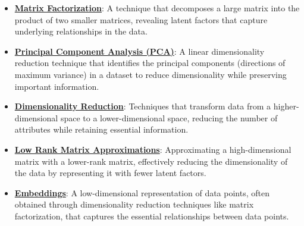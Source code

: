\documentclass{article}%
\begin{document}
\begin{itemize}[leftmargin=*]%
\item \href{https://purdue.brightspace.com/d2l/common/assets/pdfjs-d2l-dist/1.0.14-legacy/web/viewer.html?file=\%2Fcontent\%2Fenforced\%2F1095467-wl.202510.CS.24300.001\%2F11L2-svd-pca-recommender.pdf\%3Fou\%3D1095467\&lang=en-us\&container=d2l-fileviewer-rendered-pdf\&fullscreen=d2l-fileviewer-rendered-pdf-dialog\&height=667#page=2}{\textbf{Matrix Factorization}}: A technique that decomposes a large matrix into the product of two smaller matrices, revealing latent factors that capture underlying relationships in the data.%
\item \href{https://purdue.brightspace.com/d2l/common/assets/pdfjs-d2l-dist/1.0.14-legacy/web/viewer.html?file=\%2Fcontent\%2Fenforced\%2F1095467-wl.202510.CS.24300.001\%2F11L2-svd-pca-recommender.pdf\%3Fou\%3D1095467\&lang=en-us\&container=d2l-fileviewer-rendered-pdf\&fullscreen=d2l-fileviewer-rendered-pdf-dialog\&height=667#page=8}{\textbf{Principal Component Analysis (PCA)}}: A linear dimensionality reduction technique that identifies the principal components (directions of maximum variance) in a dataset to reduce dimensionality while preserving important information.%
\item \href{https://purdue.brightspace.com/d2l/common/assets/pdfjs-d2l-dist/1.0.14-legacy/web/viewer.html?file=\%2Fcontent\%2Fenforced\%2F1095467-wl.202510.CS.24300.001\%2F11L2-svd-pca-recommender.pdf\%3Fou\%3D1095467\&lang=en-us\&container=d2l-fileviewer-rendered-pdf\&fullscreen=d2l-fileviewer-rendered-pdf-dialog\&height=667#page=8}{\textbf{Dimensionality Reduction}}: Techniques that transform data from a higher-dimensional space to a lower-dimensional space, reducing the number of attributes while retaining essential information.%
\item \href{https://purdue.brightspace.com/d2l/common/assets/pdfjs-d2l-dist/1.0.14-legacy/web/viewer.html?file=\%2Fcontent\%2Fenforced\%2F1095467-wl.202510.CS.24300.001\%2F11L2-svd-pca-recommender.pdf\%3Fou\%3D1095467\&lang=en-us\&container=d2l-fileviewer-rendered-pdf\&fullscreen=d2l-fileviewer-rendered-pdf-dialog\&height=667#page=9}{\textbf{Low Rank Matrix Approximations}}: Approximating a high-dimensional matrix with a lower-rank matrix, effectively reducing the dimensionality of the data by representing it with fewer latent factors.%
\item \href{https://purdue.brightspace.com/d2l/common/assets/pdfjs-d2l-dist/1.0.14-legacy/web/viewer.html?file=\%2Fcontent\%2Fenforced\%2F1095467-wl.202510.CS.24300.001\%2F11L2-svd-pca-recommender.pdf\%3Fou\%3D1095467\&lang=en-us\&container=d2l-fileviewer-rendered-pdf\&fullscreen=d2l-fileviewer-rendered-pdf-dialog\&height=667#page=5}{\textbf{Embeddings}}: A low-dimensional representation of data points, often obtained through dimensionality reduction techniques like matrix factorization, that captures the essential relationships between data points.%

\end{itemize}
\end{document}

